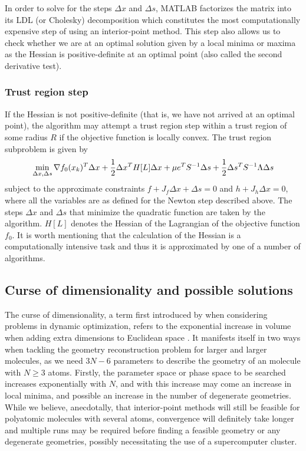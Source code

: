 In order to solve for the steps $\Delta x$ and $\Delta s$, MATLAB factorizes the matrix into its LDL (or Cholesky) decomposition which constitutes the most computationally expensive step of using an interior-point method. This step also allows us to check whether we are at an optimal solution given by a local minima or maxima as the Hessian is positive-definite at an optimal point (also called the second derivative test).

\subsubsection*{Trust region step}
If the Hessian is not positive-definite (that is, we have not arrived at an optimal point), the algorithm may attempt a trust region step within a trust region of some radius $R$ if the objective function is locally convex. The trust region subproblem is given by
\begin{equation}
\operatornamewithlimits{min}_{\Delta x, \Delta s} \nabla f_0(x_k)^T \Delta x + \frac{1}{2} \Delta x^T H[L]\Delta x + \mu e^T S^{-1} \Delta s + \frac{1}{2}\Delta s^T S^{-1} \Lambda \Delta s
\end{equation}
subject to the approximate constraints $f + J_f \Delta x + \Delta s = 0$ and   $h + J_h \Delta x = 0$, where all the variables are as defined for the Newton step described above. The steps $\Delta x$ and $\Delta s$ that minimize the quadratic function are taken by the algorithm. $H[L]$ denotes the Hessian of the Lagrangian of the objective function $f_0$. It is worth mentioning that the calculation of the Hessian is a computationally intensive task and thus it is approximated by one of a number of algorithms.

\subsection{Curse of dimensionality and possible solutions} \label{ssec:curse}
The curse of dimensionality, a term first introduced by \citet{Bellman57} when considering problems in dynamic optimization, refers to the exponential increase in volume when adding extra dimensions to Euclidean space \citep{Keogh10}. It manifests itself in two ways when tackling the geometry reconstruction problem for larger and larger molecules, as we need $3N-6$ parameters to describe the geometry of an molecule with $N \ge 3$ atoms. Firstly, the parameter space or phase space to be searched increases exponentially with $N$, and with this increase may come an increase in local minima, and possible an increase in the number of degenerate geometries. While we believe, anecdotally, that interior-point methods will still be feasible for polyatomic molecules with several atoms, convergence will definitely take longer and multiple runs may be required before finding a feasible geometry or any degenerate geometries, possibly necessitating the use of a supercomputer cluster.

